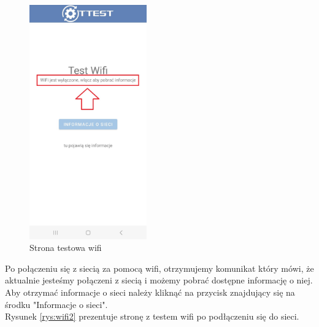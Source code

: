 \begin{figure}[!hbt]
	\begin{center}
		\includegraphics[angle=360, width=0.45\textwidth]{rys/punkt6/wifi1}
		\caption{Strona testowa wifi}
		\label{rys:wifi1}
	\end{center}
\end{figure}

\newpage


Po połączeniu się z siecią za pomocą wifi, otrzymujemy komunikat który mówi, że aktualnie jesteśmy połączeni z siecią i możemy pobrać dostępne informację o niej. Aby otrzymać informacje o sieci należy kliknąć na przycisk znajdujący się na środku "Informacje o sieci". \\
Rysunek \ref{rys:wifi2} prezentuje stronę z testem wifi po podłączeniu się do sieci.

